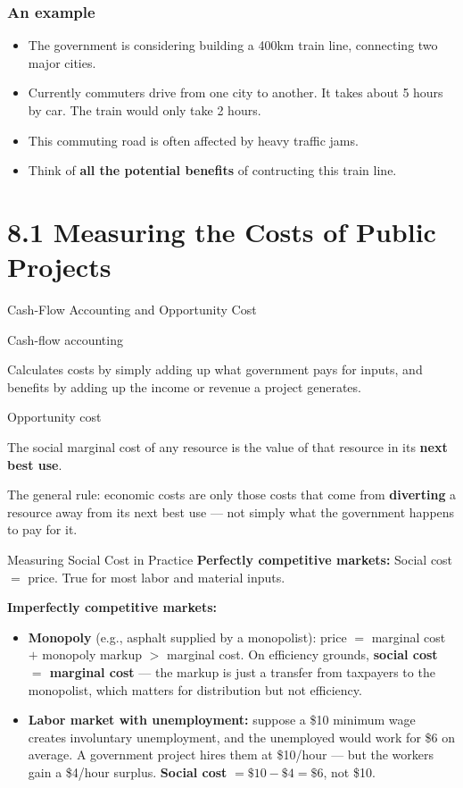 \documentclass[11pt,aspectratio=169]{beamer}
\begin{document}
\begin{frame}
	\frametitle{An example}
	\begin{itemize}
		\item The government is considering building a 400km train line, connecting two major cities. 
		\item Currently commuters drive from one city to another. It takes about 5 hours by car. The train would only take 2 hours.
		\item This commuting road is often affected by heavy traffic jams.
		\item Think of \textbf{all the potential benefits} of contructing this train line. 
	\end{itemize}
\end{frame}
\section{8.1 Measuring the Costs of Public Projects}

\begin{frame}{Cash-Flow Accounting and Opportunity Cost}
  \begin{block}{Cash-flow accounting}
    \end{block}
    Calculates costs by simply adding up what government pays for inputs, and benefits by adding up the income or revenue a project generates.

  \begin{block}{Opportunity cost}
  \end{block}
    The social marginal cost of any resource is the value of that resource in its \textbf{next best use}.

  \vspace{0.4em}
  The general rule: economic costs are only those costs that come from \textbf{diverting} a resource away from its next best use --- not simply what the government happens to pay for it.
\end{frame}

\begin{frame}{Measuring Social Cost in Practice}
  \textbf{Perfectly competitive markets:} Social cost $=$ price. True for most labor and material inputs.
  \vspace{0.5em}

  \textbf{Imperfectly competitive markets:}
  \begin{itemize}
    \item \textbf{Monopoly} (e.g., asphalt supplied by a monopolist): price $=$ marginal cost $+$ monopoly markup $>$ marginal cost. On efficiency grounds, \textbf{social cost $=$ marginal cost} --- the markup is just a transfer from taxpayers to the monopolist, which matters for distribution but not efficiency.
    \item \textbf{Labor market with unemployment:} suppose a \$10 minimum wage creates involuntary unemployment, and the unemployed would work for \$6 on average. A government project hires them at \$10/hour --- but the workers gain a \$4/hour surplus. \textbf{Social cost} $= \$10 - \$4 = \$6$, not \$10.
  \end{itemize}
\end{frame}
\end{document}
